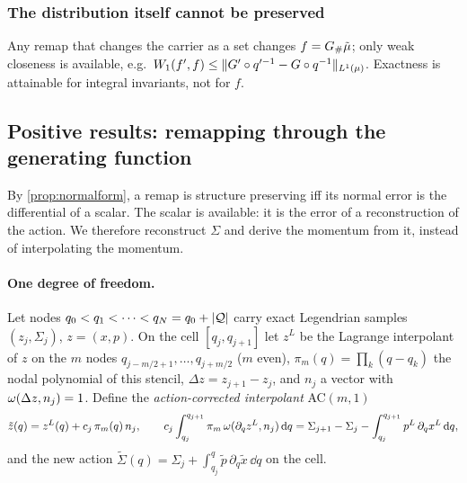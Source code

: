 \subsubsection*{The distribution itself cannot be preserved}
Any remap that changes the carrier as a set changes $f=G{}_{\#}\tilde\mu$; only weak closeness is available, e.g.\
$W_1(f',f)\le\lVert G'\circ q'^{-1}-G\circ q^{-1}\rVert_{L^1(\mu)}$. Exactness is attainable for integral invariants, not for $f$.

\subsection{Positive results: remapping through the generating function}\label{sec:positive}

By \cref{prop:normalform}, a remap is structure preserving iff its normal error is the differential of a scalar.
The scalar is available: it is the error of a reconstruction of the action. We therefore reconstruct $\Sigma$
and derive the momentum from it, instead of interpolating the momentum.

\paragraph{One degree of freedom.}
Let nodes $q_0<q_1<\dots<q_N=q_0+\lvert \mathcal{Q}\rvert$ carry exact Legendrian samples $(z_j,\Sigma_j)$, $z=(x,p)$. On the cell
$[q_j,q_{j+1}]$ let $z^L$ be the Lagrange interpolant of $z$ on the $m$ nodes $q_{j-m/2+1},\dots,q_{j+m/2}$
($m$ even), $\pi_m(q)=\prod_k(q-q_k)$ the nodal polynomial of this stencil, $\Delta z=z_{j+1}-z_j$, and $n_j$ a
vector with $\omega(\Delta z,n_j)=1$. Define the \emph{action-corrected interpolant} AC$(m,1)$
\begin{equation}\label{eq:ac}
\tilde z(q)=z^L(q)+c_j\,\pi_m(q)\,n_j,\qquad
c_j\int_{q_j}^{q_{j+1}}\pi_m\,\omega(\partial_qz^L,n_j)\,\mathrm{d} q=\Sigma_{j+1}-\Sigma_j-\int_{q_j}^{q_{j+1}}p^L\,\partial_qx^L\,\mathrm{d} q ,
\end{equation}
and the new action $\tilde\Sigma(q)=\Sigma_j+\int_{q_j}^{q}\tilde p\,\partial_q\tilde x\,\dd q$ on the cell.

